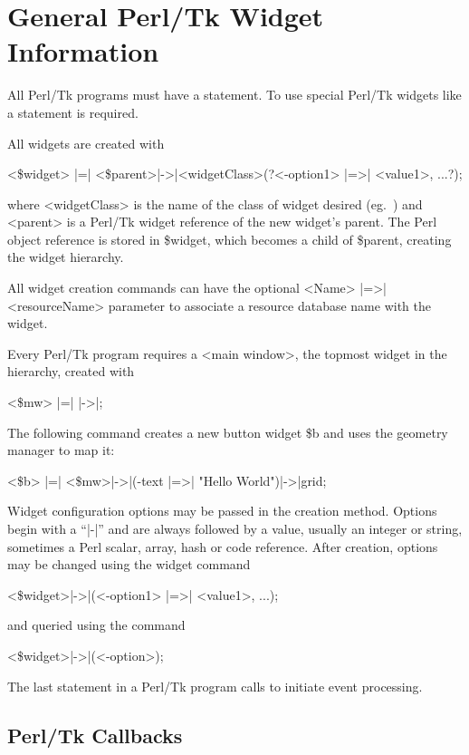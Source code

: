 \section{General Perl/Tk Widget Information} 

All Perl/Tk programs must have a  statement.  To use special Perl/Tk
widgets like  a  statement is required.

All widgets are created with

\quad \quad <\$widget> |=| <\$parent>|->|<widgetClass>(?<-option1> |=>| <value1>, ...?);

where <widgetClass> is the name of the class of 
widget desired (eg.\ ) and <parent> is a Perl/Tk widget reference
of the new widget's parent.  The Perl object reference is stored in \$widget,
which becomes a child of \$parent, creating the widget hierarchy.

All widget creation commands can have the optional <Name> |=>| <resourceName> 
parameter to associate a resource database name with the widget.  

Every Perl/Tk program requires a <main window>, the topmost widget in the
hierarchy, created with

\quad \quad <\$mw> |=| |->|;

The following command creates a new button widget \$b and uses the 
geometry manager to map it:

\quad \quad <\$b> |=| <\$mw>|->|(-text |=>| "Hello World")|->|grid;

Widget configuration options may be passed in the creation method.  Options
begin with a ``|-|'' and are always followed by a value, usually an integer
or string, sometimes a Perl scalar, array, hash or code reference.  After
creation, options may be changed using the  widget command

\quad \quad <\$widget>|->|(<-option1> |=>| <value1>, ...);

and queried using the  command

\quad \quad <\$widget>|->|(<-option>);

The last statement in a Perl/Tk program calls  to initiate
event processing.

\subsection*{Perl/Tk Callbacks}

